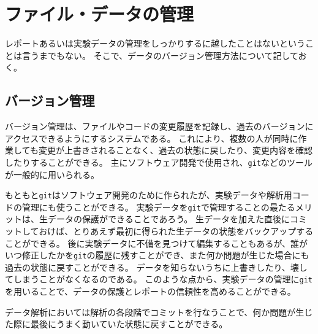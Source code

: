 \section{ファイル・データの管理}

レポートあるいは実験データの管理をしっかりするに越したことはないということは言うまでもない。
そこで、データのバージョン管理方法について記しておく。

\subsection{バージョン管理}
バージョン管理は、ファイルやコードの変更履歴を記録し、過去のバージョンにアクセスできるようにするシステムである。
これにより、複数の人が同時に作業しても変更が上書きされることなく、過去の状態に戻したり、変更内容を確認したりすることができる。
主にソフトウェア開発で使用され、\verb|git|などのツールが一般的に用いられる。

もともと\verb|git|はソフトウェア開発のために作られたが、実験データや解析用コードの管理にも使うことができる。
実験データを\verb|git|で管理することの最たるメリットは、生データの保護ができることであろう。
生データを加えた直後にコミットしておけば、とりあえず最初に得られた生データの状態をバックアップすることができる。
後に実験データに不備を見つけて編集することもあるが、誰がいつ修正したかを\verb|git|の履歴に残すことができ、また何か問題が生じた場合にも過去の状態に戻すことができる。
データを知らないうちに上書きしたり、壊してしまうことがなくなるのである。
このような点から、実験データの管理に\verb|git|を用いることで、データの保護とレポートの信頼性を高めることができる。

データ解析においては解析の各段階でコミットを行なうことで、何か問題が生じた際に最後にうまく動いていた状態に戻すことができる。




